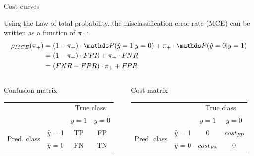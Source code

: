 


\begin{vbframe}{Cost curves}

Using the Law of total probability, the misclassification error rate (MCE) can be written as a function of $\pi_{+}$:
\begin{align*}
\rho_{MCE}(\rp)
&= (1 - \rp) \cdot \P(\hat y = 1 | y = 0) + \rp \cdot \P(\hat y = 0 | y = 1) \\
&= (1 - \rp) \cdot FPR + \rp \cdot FNR \\
&= (FNR - FPR) \cdot \rp + FPR
\end{align*}
\lz
\begin{columns}
\begin{column}{0.5\textwidth}
{\centering Confusion matrix
\begin{center}
\begin{tabular}{cc|cc}
    & &\multicolumn{2}{c}{True class} \\
    & & $y=1$ & $y=0$  \\
 \hline
    \multirow{2}{*}{\parbox{0.6cm}{Pred.  class}}& $\hat y$ = 1     & TP                 & FP\\
    & $\hat y$ = 0 & FN              & TN\\
\end{tabular}
\end{center}
}
\end{column}
\begin{column}{0.5\textwidth}
{\centering Cost matrix
\begin{center}
\begin{tabular}{cc|cc}
    & &\multicolumn{2}{c}{True class} \\
    & & $y=1$ & $y=0$  \\
 \hline
    \multirow{2}{*}{\parbox{0.6cm}{Pred.  class}}& $\hat y$ = 1     & 0                 & $cost_{FP}$\\
    & $\hat y$ = 0 & $cost_{FN}$              & 0\\
\end{tabular}
\end{center}
}
\end{column}
\end{columns}


\end{vbframe}

